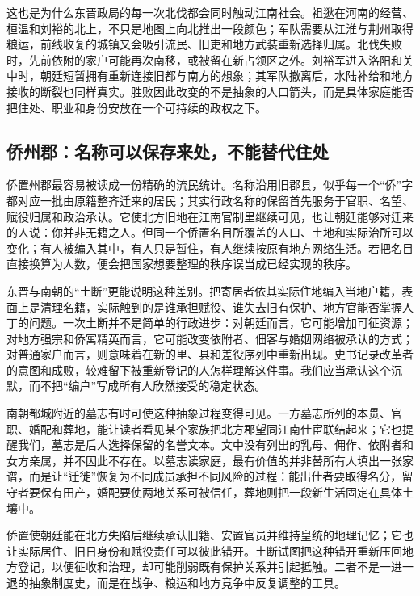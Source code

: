 这也是为什么东晋政局的每一次北伐都会同时触动江南社会。祖逖在河南的经营、桓温和刘裕的北上，不只是地图上向北推出一段颜色；军队需要从江淮与荆州取得粮运，前线收复的城镇又会吸引流民、旧吏和地方武装重新选择归属。北伐失败时，先前依附的家户可能再次南移，或被留在新占领区之外。刘裕军进入洛阳和关中时，朝廷短暂拥有重新连接旧都与南方的想象；其军队撤离后，水陆补给和地方接收的断裂也同样真实。胜败因此改变的不是抽象的人口箭头，而是具体家庭能否把住处、职业和身份安放在一个可持续的政权之下。

\subsection{侨州郡：名称可以保存来处，不能替代住处}

侨置州郡最容易被读成一份精确的流民统计。名称沿用旧郡县，似乎每一个“侨”字都对应一批由原籍整齐迁来的居民；其实行政名称的保留首先服务于官职、名望、赋役归属和政治承认。它使北方旧地在江南官制里继续可见，也让朝廷能够对迁来的人说：你并非无籍之人。但同一个侨置名目所覆盖的人口、土地和实际治所可以变化；有人被编入其中，有人只是暂住，有人继续按原有地方网络生活。若把名目直接换算为人数，便会把国家想要整理的秩序误当成已经实现的秩序。

东晋与南朝的“土断”更能说明这种差别。把寄居者依其实际住地编入当地户籍，表面上是清理名籍，实际触到的是谁承担赋役、谁失去旧有保护、地方官能否掌握人丁的问题。一次土断并不是简单的行政进步：对朝廷而言，它可能增加可征资源；对地方强宗和侨寓精英而言，它可能改变依附者、佃客与婚姻网络被承认的方式；对普通家户而言，则意味着在新的里、县和差役序列中重新出现。史书记录改革者的意图和成败，较难留下被重新登记的人怎样理解这件事。我们应当承认这个沉默，而不把“编户”写成所有人欣然接受的稳定状态。

南朝都城附近的墓志有时可使这种抽象过程变得可见。一方墓志所列的本贯、官职、婚配和葬地，能让读者看见某个家族把北方郡望同江南仕宦联结起来；它也提醒我们，墓志是后人选择保留的名誉文本。文中没有列出的乳母、佣作、依附者和女方亲属，并不因此不存在。以墓志读家庭，最有价值的并非替所有人填出一张家谱，而是让“迁徙”恢复为不同成员承担不同风险的过程：能出仕者要取得名分，留守者要保有田产，婚配要使两地关系可被信任，葬地则把一段新生活固定在具体土壤中。

\begin{causalchain}[侨置与土断的制度得失]
侨置使朝廷能在北方失陷后继续承认旧籍、安置官员并维持皇统的地理记忆；它也让实际居住、旧日身份和赋役责任可以彼此错开。土断试图把这种错开重新压回地方登记，以便征收和治理，却可能削弱既有保护关系并引起抵触。二者不是一进一退的抽象制度史，而是在战争、粮运和地方竞争中反复调整的工具。
\end{causalchain}

